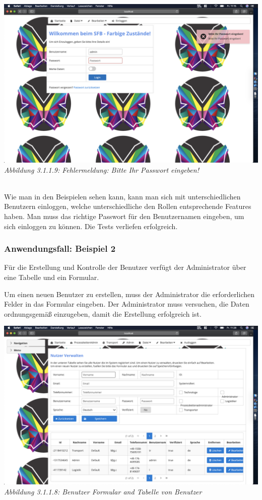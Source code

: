 \documentclass[enabledeprecatedfontcommands,fontsize=12pt,paper=a4,twoside]{scrartcl}
\begin{document}
\hypertarget{sc3.1.1.9}{
\includegraphics[width=1\textwidth]{Screenshots/311BittePasswordEingeben.png}
\textit{Abbildung 3.1.1.9: Fehlermeldung: Bitte Ihr Passwort eingeben!}
} \\

Wie man in den Beispielen sehen kann, kann man sich mit unterschiedlichen Benutzern einloggen, welche unterschiedliche den Rollen entsprechende Features haben. Man muss das richtige Passwort für den Benutzernamen eingeben, um sich einloggen zu können. Die Tests verliefen erfolgreich. \\ 


\subsubsection{Anwendungsfall: Beispiel 2}
Für die Erstellung und Kontrolle der Benutzer verfügt der Administrator über eine Tabelle und ein Formular.

Um einen neuen Benutzer zu erstellen, muss der Administrator die erforderlichen Felder in das Formular eingeben. Der Administrator muss versuchen, die Daten ordnungsgemäß einzugeben, damit die Erstellung erfolgreich ist.

\hypertarget{sc3.1.2.1}{
\includegraphics[width=1\textwidth]{Screenshots/UserErzeugenFormular.png}
\textit{Abbildung 3.1.1.8: Benutzer Formular and Tabelle von Benutzer}
} \\
\end{document}
